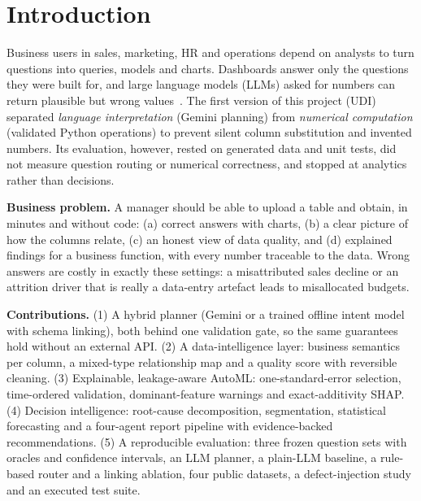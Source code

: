 \documentclass[conference]{IEEEtran}
\begin{document}
\section{Introduction}
Business users in sales, marketing, HR and operations depend on analysts to turn questions into queries, models and charts. Dashboards answer only the questions they were built for, and large language models (LLMs) asked for numbers can return plausible but wrong values~\cite{hong2024,tang2025}. The first version of this project (UDI) separated \emph{language interpretation} (Gemini planning) from \emph{numerical computation} (validated Python operations) to prevent silent column substitution and invented numbers. Its evaluation, however, rested on generated data and unit tests, did not measure question routing or numerical correctness, and stopped at analytics rather than decisions.

\textbf{Business problem.} A manager should be able to upload a table and obtain, in minutes and without code: (a) correct answers with charts, (b) a clear picture of how the columns relate, (c) an honest view of data quality, and (d) explained findings for a business function, with every number traceable to the data. Wrong answers are costly in exactly these settings: a misattributed sales decline or an attrition driver that is really a data-entry artefact leads to misallocated budgets.

\textbf{Contributions.} (1) A hybrid planner (Gemini or a trained offline intent model with schema linking), both behind one validation gate, so the same guarantees hold without an external API. (2) A data-intelligence layer: business semantics per column, a mixed-type relationship map and a quality score with reversible cleaning. (3) Explainable, leakage-aware AutoML: one-standard-error selection, time-ordered validation, dominant-feature warnings and exact-additivity SHAP. (4) Decision intelligence: root-cause decomposition, segmentation, statistical forecasting and a four-agent report pipeline with evidence-backed recommendations. (5) A reproducible evaluation: three frozen question sets with oracles and confidence intervals, an LLM planner, a plain-LLM baseline, a rule-based router and a linking ablation, four public datasets, a defect-injection study and an executed test suite.
\end{document}
